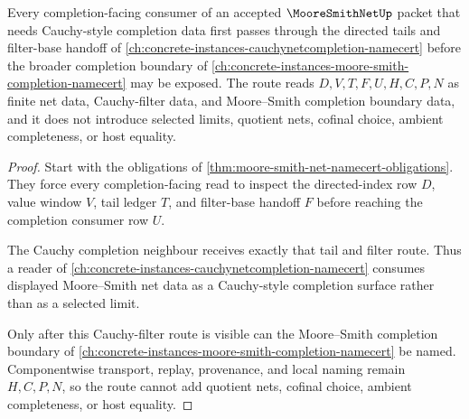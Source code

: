 \begin{theorem}\label{thm:moore-smith-net-cauchy-filter-handoff}
Every completion-facing consumer of an accepted $\MooreSmithNetUp$ packet that needs Cauchy-style completion data first passes through the directed tails and filter-base handoff of \autoref{ch:concrete-instances-cauchynetcompletion-namecert} before the broader completion boundary of \autoref{ch:concrete-instances-moore-smith-completion-namecert} may be exposed. The route reads $D,V,T,F,U,H,C,P,N$ as finite net data, Cauchy-filter data, and Moore--Smith completion boundary data, and it does not introduce selected limits, quotient nets, cofinal choice, ambient completeness, or host equality.
\end{theorem}
\begin{proof}
Start with the obligations of \autoref{thm:moore-smith-net-namecert-obligations}. They force every completion-facing read to inspect the directed-index row $D$, value window $V$, tail ledger $T$, and filter-base handoff $F$ before reaching the completion consumer row $U$.

The Cauchy completion neighbour receives exactly that tail and filter route. Thus a reader of \autoref{ch:concrete-instances-cauchynetcompletion-namecert} consumes displayed Moore--Smith net data as a Cauchy-style completion surface rather than as a selected limit.

Only after this Cauchy-filter route is visible can the Moore--Smith completion boundary of \autoref{ch:concrete-instances-moore-smith-completion-namecert} be named. Componentwise transport, replay, provenance, and local naming remain $H,C,P,N$, so the route cannot add quotient nets, cofinal choice, ambient completeness, or host equality.
\end{proof}

